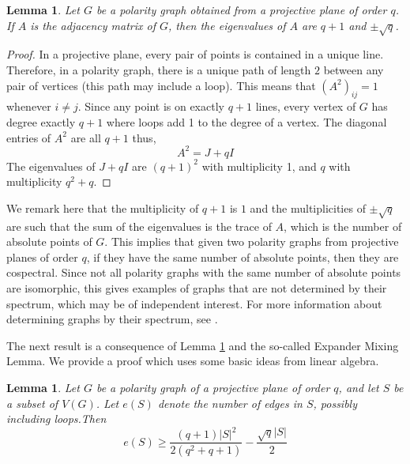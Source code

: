 \documentclass[12pt]{article}
\newtheorem{lemma}[theorem]{Lemma}
\begin{document}
\begin{lemma}\label{eigenvalues of polarity graph}
    Let $G$ be a polarity graph obtained from a projective plane of order $q$.  If $A$ is the adjacency matrix of $G$, then the eigenvalues of $A$ are $q+1$ and $\pm \sqrt{q}$.
\end{lemma}


\begin{proof}
    In a projective plane, every pair of points is contained in a unique line. Therefore, in a polarity graph, there is a unique path of length $2$ between any pair of vertices (this path may include a loop). This means that $(A^2)_{ij} = 1$ whenever $i\not=j$. Since any point is on exactly $q+1$ lines, every vertex of $G$ has degree exactly $q+1$ where loops add 1 to the degree of a vertex. The diagonal entries of $A^2$ are all $q+1$ thus,
    $$ A^2 = J + qI $$
    The eigenvalues of $J+qI$ are $(q+1)^2$ with multiplicity 1, and $q$ with multiplicity $q^2 + q$.
\end{proof}

We remark here that the multiplicity of $q+1$ is $1$ and the multiplicities of $\pm \sqrt{q}$ are such that the sum of the eigenvalues is the trace of $A$, which is the number of absolute points of $G$. This implies that given two polarity graphs from projective planes of order $q$, if they have the same number of absolute points, then they are cospectral. Since not all polarity graphs with the same number of absolute points are isomorphic, this gives examples of graphs that are not determined by their spectrum, which may be of independent interest. For more information about determining graphs by their spectrum, see \cite{haemers}.

The next result is a consequence of Lemma \ref{eigenvalues of polarity graph} and the so-called Expander Mixing Lemma.
We provide a proof which uses some basic ideas from linear algebra.

\begin{lemma}\label{expander mixing lemma for ERq}
    Let $G$ be a polarity graph of a projective plane of order $q$, and let $S$ be a subset of $V(G)$.
    Let $e(S)$ denote the number of edges in $S$, possibly including loops.Then
    $$ e(S)\geq \frac{(q+1)|S|^2}{2(q^2+q+1)} - \frac{\sqrt{q}|S|}{2} $$
\end{lemma}
\end{document}
